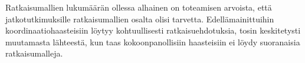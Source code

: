 Ratkaisumallien lukumäärän ollessa alhainen on toteamisen arvoista, että jatkotutkimuksille ratkaisumallien osalta olisi tarvetta. Edellämainittuihin koordinaatiohaasteisiin löytyy kohtuullisesti ratkaisuehdotuksia, tosin keskitetysti muutamasta lähteestä, kun taas kokoonpanollisiin haasteisiin ei löydy suoranaisia ratkaisumalleja.
